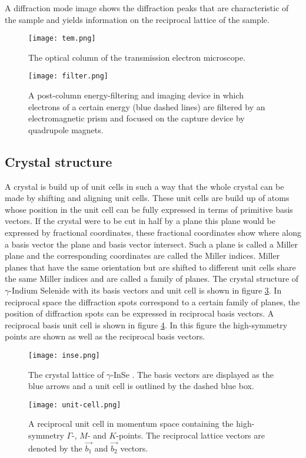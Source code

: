 A diffraction mode image shows the diffraction peaks that are characteristic of the sample and yields information on the reciprocal lattice of the sample.\cite{Egerton_2008}
%
\begin{figure}[H]
	\centering
	\captionsetup{width=0.9\linewidth}
	\texttt{[image: tem.png]}
	\caption{The optical column of the transmission electron microscope.}
	\label{fig:tem}
\end{figure}
%
\begin{figure}[H]
	\centering
	\captionsetup{width=0.9\linewidth}
	\texttt{[image: filter.png]}
	\caption{A post-column energy-filtering and imaging device in which electrons of a certain energy (blue dashed lines) are filtered by an electromagnetic prism and focused on the capture device by quadrupole magnets.}
	\label{fig:filter}
\end{figure}
\vfill
\subsection{Crystal structure}
A crystal is build up of unit cells in such a way that the whole crystal can be made by shifting and aligning unit cells. These unit cells are build up of atoms whose position in the unit cell can be fully expressed in terms of primitive basis vectors. If the crystal were to be cut in half by a plane this plane would be expressed by fractional coordinates, these fractional coordinates show where along a basis vector the plane and basis vector intersect. Such a plane is called a Miller plane and the corresponding coordinates are called the Miller indices. Miller planes that have the same orientation but are shifted to different unit cells share the same Miller indices and are called a family of planes. The crystal structure of $\gamma$-Indium Selenide with its basis vectors and unit cell is shown in figure \ref{fig:inse}. In reciprocal space the diffraction spots correspond to a certain family of planes, the position of diffraction spots can be expressed in reciprocal basis vectors. A reciprocal basis unit cell is shown in figure \ref{fig:unit-cell}. In this figure the high-symmetry points are shown as well as the reciprocal basis vectors.\cite{Simon:1581455}\\
%
\begin{figure}[H]
	\centering
	\captionsetup{width=0.9\linewidth}
	\texttt{[image: inse.png]}
	\caption{The crystal lattice of $\gamma$-InSe \cite{Magorrian2019, MA2017244}. The basis vectors are displayed as the blue arrows and a unit cell is outlined by the dashed blue box.}
	\label{fig:inse}
\end{figure}
%
\begin{figure}[H]
	\centering
	\captionsetup{width=0.9\linewidth}
	\texttt{[image: unit-cell.png]}
	\caption{A reciprocal unit cell in momentum space containing the high-symmetry $\Gamma$-, $M$- and $K$-points. The reciprocal lattice vectors are denoted by the $\vec{b_1}$ and $\vec{b_2}$ vectors.}
	\label{fig:unit-cell}
\end{figure}
%
